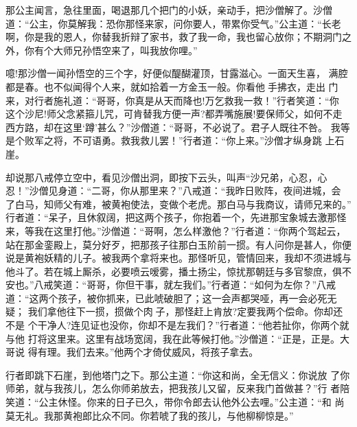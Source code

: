 那公主闻言，急往里面，喝退那几个把门的小妖，亲动手，把沙僧解了。沙僧
道：“公主，你莫解我：恐你那怪来家，问你要人，带累你受气。”公主道：“长老
啊，你是我的恩人，你替我折辩了家书，救了我一命，我也留心放你；不期洞门之
外，你有个大师兄孙悟空来了，叫我放你哩。”

噫!那沙僧一闻孙悟空的三个字，好便似醍醐灌顶，甘露滋心。一面天生喜，
满腔都是春。也不似闻得个人来，就如拾着一方金玉一般。你看他手拂衣，走出
门来，对行者施礼道：“哥哥，你真是从天而降也!万乞救我一救！”行者笑道：“你
这个沙尼!师父念紧箍儿咒，可肯替我方便一声?都弄嘴施展!要保师父，如何不走
西方路，却在这里‘蹲’甚么？”沙僧道：“哥哥，不必说了。君子人既往不咎。
我等是个败军之将，不可语勇。救我救儿罢！”行者道：“你上来。”沙僧才纵身跳
上石崖。

却说那八戒停立空中，看见沙僧出洞，即按下云头，叫声“沙兄弟，心忍，心
忍！”沙僧见身道：“二哥，你从那里来？”八戒道：“我昨日败阵，夜间进城，会
了白马，知师父有难，被黄袍使法，变做个老虎。那白马与我商议，请师兄来的。”
行者道：“呆子，且休叙阔，把这两个孩子，你抱着一个，先进那宝象城去激那怪
来，等我在这里打他。”沙僧道：“哥啊，怎么样激他？”行者道：“你两个驾起云，
站在那金銮殿上，莫分好歹，把那孩子往那白玉阶前一掼。有人问你是甚人，你便
说是黄袍妖精的儿子。被我两个拿将来也。那怪听见，管情回来，我却不须进城与
他斗了。若在城上厮杀，必要喷云嗳雾，播土扬尘，惊扰那朝廷与多官黎庶，俱不
安也。”八戒笑道：“哥哥，你但干事，就左我们。”行者道：“如何为左你？”八戒
道：“这两个孩子，被你抓来，已此唬破胆了；这一会声都哭哑，再一会必死无疑；
我们拿他往下一掼，掼做个肉子，那怪赶上肯放?定要我两个偿命。你却还不是
个干净人?连见证也没你，你却不是左我们？”行者道：“他若扯你，你两个就与他
打将这里来。这里有战场宽阔，我在此等候打他。”沙僧道：“正是，正是。大哥说
得有理。我们去来。”他两个才倚仗威风，将孩子拿去。

行者即跳下石崖，到他塔门之下。那公主道：“你这和尚，全无信义：你说放
了你师弟，就与我孩儿，怎么你师弟放去，把我孩儿又留，反来我门首做甚？”行
者陪笑道：“公主休怪。你来的日子已久，带你令郎去认他外公去哩。”公主道：“和
尚莫无礼。我那黄袍郎比众不同。你若唬了我的孩儿，与他柳柳惊是。”

